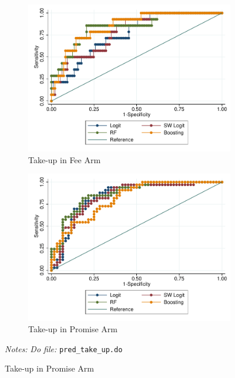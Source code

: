 \documentclass[11pt]{article}
\begin{document}
\begin{figure}[H]
    \caption{Out of sample ROC curve}
    \label{roc_curve}
    \begin{center}
    \begin{subfigure}{0.45\textwidth}
        \caption{Take-up in Fee Arm}
        \centering
        \includegraphics[width=\textwidth]{Figuras/Boost/ROC_curve_outsample_pago_frec_vol_fee.pdf}
    \end{subfigure}
    \begin{subfigure}{0.45\textwidth}
        \caption{Take-up in Promise Arm}
        \centering
        \includegraphics[width=\textwidth]{Figuras/Boost/ROC_curve_outsample_pago_frec_vol_promise.pdf}
    \end{subfigure}
    \end{center}
     \footnotesize \textit{Notes: } 
  \footnotesize{ \textit{Do file: }  \texttt{pred\_take\_up.do}}
\end{figure}
\end{document}
